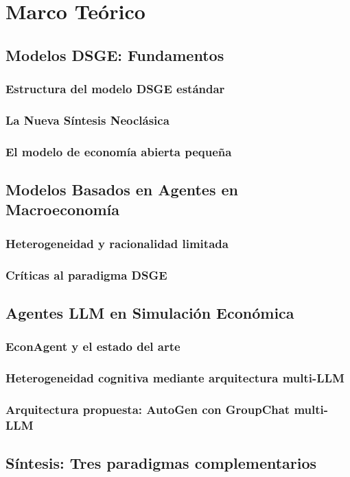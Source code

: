 
\chapter{Marco Teórico}
\label{chap:marco-teorico}

\section{Modelos DSGE: Fundamentos}
\label{sec:dsge-teoria}

\subsection{Estructura del modelo DSGE estándar}
\label{subsec:estructura-dsge}

\subsection{La Nueva Síntesis Neoclásica}
\label{subsec:nns}

\subsection{El modelo de economía abierta pequeña}
\label{subsec:soe}

\section{Modelos Basados en Agentes en Macroeconomía}
\label{sec:abm-teoria}

\subsection{Heterogeneidad y racionalidad limitada}
\label{subsec:abm-heterogeneidad}

\subsection{Críticas al paradigma DSGE}
\label{subsec:criticas-dsge}

\section{Agentes LLM en Simulación Económica}
\label{sec:llm-teoria}

\subsection{EconAgent y el estado del arte}
\label{subsec:econagent}

\subsection{Heterogeneidad cognitiva mediante arquitectura multi-LLM}
\label{subsec:heterogeneidad-llm}

\subsection{Arquitectura propuesta: AutoGen con GroupChat multi-LLM}
\label{subsec:arquitectura}

\section{Síntesis: Tres paradigmas complementarios}
\label{sec:sintesis-paradigmas}
